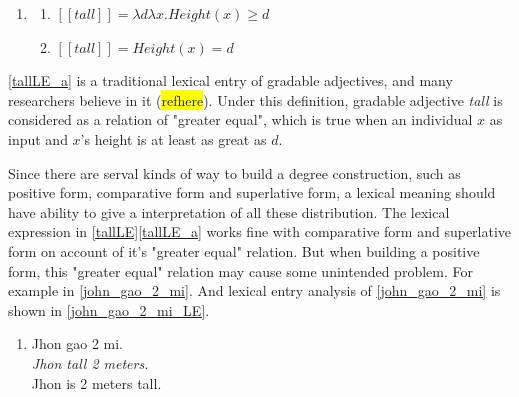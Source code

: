 \documentclass{ctexart}
\begin{document}
\begin{enumerate}[resume]
    \item \label{tallLE}
    
    \begin{enumerate}
    \item \label{tallLE_a} 
    $[\![tall]\!]=\lambda d \lambda x.Height(x) \geq d$
    
    \item \label{tallLE_b} 
    $[\![tall]\!]=Height(x)=d$
    
    \end{enumerate}
\end{enumerate}

\ref{tallLE_a} is a traditional lexical entry of gradable adjectives, and many researchers believe in it (\colorbox{yellow}{refhere}). Under this definition, gradable adjective \textit{tall} is considered as a relation of "greater equal", which is true when an individual $x$ as input and $x$'s height is at least as great as $d$.

Since there are serval kinds of way to build a degree construction, such as positive form, comparative form and superlative form, a lexical meaning should have ability to give a interpretation of all these distribution. The lexical expression in \ref{tallLE}\ref{tallLE_a} works fine with comparative form and superlative form on account of it's "greater equal" relation. But when building a positive form, this "greater equal" relation may cause some unintended problem. For example in \ref{john_gao_2_mi}. And lexical entry analysis of \ref{john_gao_2_mi} is shown in \ref{john_gao_2_mi_LE}.

\begin{enumerate}[resume]
    \item \label{john_gao_2_mi}
    Jhon gao 2 mi.  \\
    \textit{Jhon tall 2 meters.}    \\
    Jhon is 2 meters tall.
    
\end{enumerate}
\end{document}
